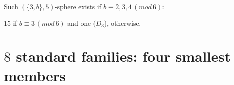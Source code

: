 \documentclass{beamer}
\begin{document}
\begin{frame}
Such ${(\{3,b\},5)}$-sphere  exists
if
$b\equiv 2,3,4\,(mod\,6)$:

$15$  if $b\equiv 3\,(mod\,6)$
and one ($D_{3}$), 
otherwise.

\end{frame}


\section[]{$8$ standard families: four  smallest members}

\frame{
\begin{center}
\begin{tabular*}{7cm}{c}
\\[-0.5cm]
{\Huge \textcolor{blue}{IV. }\textcolor{red}{
$8$ standard families:}}
\\[4mm]{\Huge \textcolor{red}{
$4$ smallest members}
}
\end{tabular*}
\end{center}
}
\end{document}

